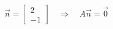 \documentclass[preview]{standalone}
\begin{document}
\begin{align*}
\vec n=\begin{bmatrix}2\\-1\end{bmatrix} \quad\Rightarrow\quad A\vec n=\vec 0
\end{align*}
\end{document}
